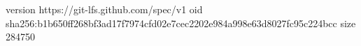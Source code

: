 version https://git-lfs.github.com/spec/v1
oid sha256:b1b650ff268bf3ad17f7974cfd02e7cec2202e984a998e63d8027fc95c224bcc
size 284750
